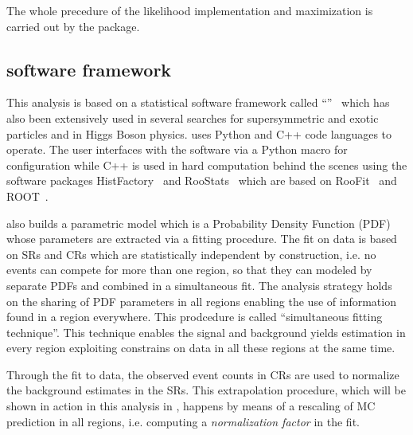 The whole precedure of the likelihood implementation and maximization is carried out by the \hf package.

\subsection{\hf software framework}

This analysis is based on a statistical software framework called ``\hf''~\cite{baak:histfitter} which has also been extensively used in several searches for supersymmetric and exotic particles and in Higgs Boson physics. 
\hf uses Python and C++ code languages to operate. The user interfaces with the software via a Python macro for configuration while C++ is used in hard computation behind the scenes using the software packages HistFactory~\cite{Cranmer:1456844} and RooStats~\cite{2010acat.confE..57M} which are based on RooFit~\cite{2003physics...6116V} and ROOT~\cite{Brun:1997pa}.

\hf also builds a parametric model which is a Probability Density Function (PDF) whose parameters are extracted via a fitting procedure. The fit on data is based on SRs and CRs which are statistically independent by construction, i.e. no events can compete for more than one region, so that they can modeled by separate PDFs and combined in a simultaneous fit. The \hf analysis strategy holds on the sharing of PDF parameters in all regions enabling the use of information found in a region everywhere. This prodcedure is called ``simultaneous fitting technique''. This technique enables the signal and background yields estimation in every region exploiting constrains on data in all these regions at the same time.

Through the fit to data, the observed event counts in CRs are used to normalize the background estimates in the SRs. This extrapolation procedure, which will be shown in action in this analysis in \Fig{\ref{fig:regions}}, happens by means of a rescaling of MC prediction in all regions, i.e. computing a \emph{normalization factor} in the fit.


